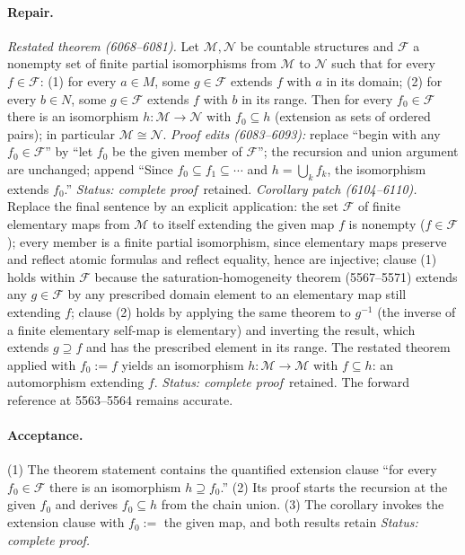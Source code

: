 \paragraph{Repair.} \emph{Restated theorem (6068--6081).}  Let
\(\mathcal M,\mathcal N\) be countable structures and \(\mathcal F\) a
nonempty set of finite partial isomorphisms from \(\mathcal M\) to
\(\mathcal N\) such that for every \(f\in\mathcal F\): (1) for every
\(a\in M\), some \(g\in\mathcal F\) extends \(f\) with \(a\) in its domain;
(2) for every \(b\in N\), some \(g\in\mathcal F\) extends \(f\) with \(b\)
in its range.  Then for every \(f_0\in\mathcal F\) there is an isomorphism
\(h:\mathcal M\to\mathcal N\) with \(f_0\subseteq h\) (extension as sets of
ordered pairs); in particular \(\mathcal M\cong\mathcal N\).
\emph{Proof edits (6083--6093):} replace ``begin with any
\(f_0\in\mathcal F\)'' by ``let \(f_0\) be the given member of
\(\mathcal F\)''; the recursion and union argument are unchanged; append
``Since \(f_0\subseteq f_1\subseteq\cdots\) and \(h=\bigcup_k f_k\), the
isomorphism extends \(f_0\).''  \textit{Status: complete proof}\ retained.
\emph{Corollary patch (6104--6110).}  Replace the final sentence by an
explicit application: the set \(\mathcal F\) of finite elementary maps from
\(\mathcal M\) to itself extending the given map \(f\) is nonempty
(\(f\in\mathcal F\)); every member is a finite partial isomorphism, since
elementary maps preserve and reflect atomic formulas and reflect equality,
hence are injective; clause (1) holds within \(\mathcal F\) because the
saturation-homogeneity theorem (5567--5571) extends any \(g\in\mathcal F\)
by any prescribed domain element to an elementary map still extending
\(f\); clause (2) holds by applying the same theorem to \(g^{-1}\) (the
inverse of a finite elementary self-map is elementary) and inverting the
result, which extends \(g\supseteq f\) and has the prescribed element in
its range.  The restated theorem applied with \(f_0:=f\) yields an
isomorphism \(h:\mathcal M\to\mathcal M\) with \(f\subseteq h\): an
automorphism extending \(f\).  \textit{Status: complete proof}\ retained.
The forward reference at 5563--5564 remains accurate.

\paragraph{Acceptance.} (1) The theorem statement contains the quantified
extension clause ``for every \(f_0\in\mathcal F\) there is an isomorphism
\(h\supseteq f_0\).''  (2) Its proof starts the recursion at the given
\(f_0\) and derives \(f_0\subseteq h\) from the chain union.  (3) The
corollary invokes the extension clause with \(f_0:=\) the given map, and
both results retain \textit{Status: complete proof.}
